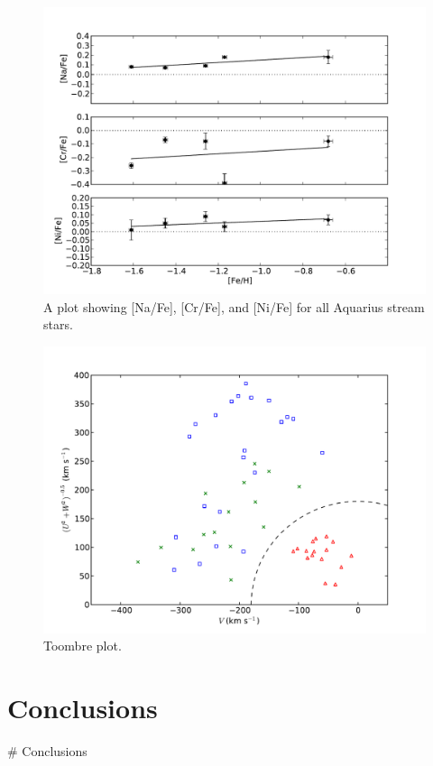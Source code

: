 \documentclass{emulateapj}
\begin{document}
\begin{figure}[h]
	\includegraphics[width=\columnwidth]{./figures/aquarius-na-cr-ni-fe.pdf}
	\caption{A plot showing [Na/Fe], [Cr/Fe], and [Ni/Fe] for all Aquarius stream stars.}
	\label{fig:na-cr-ni-fe}
\end{figure}




\begin{figure}[h]
	\includegraphics[width=\columnwidth]{./figures/plot-toombre.pdf}
	\caption{Toombre plot.}
	\label{fig:toombre}
\end{figure}

\section{Conclusions}
\label{sec:conclusions}
\# Conclusions





\end{document}
